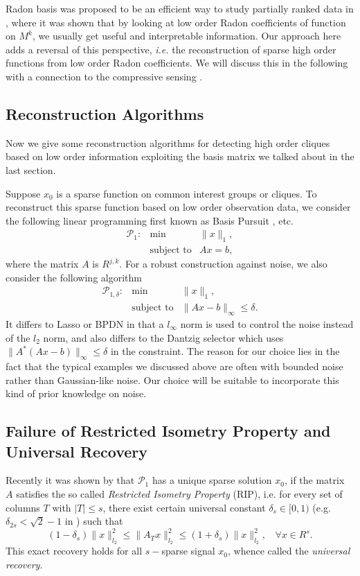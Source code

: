 \documentclass{article}
\begin{document}
Radon basis was proposed to be an efficient way to study partially ranked data in \cite{Persi88}, where 
it was shown that by looking at low order Radon coefficients of function on $M^k$, we usually get useful and interpretable 
information. Our approach here adds a reversal of this perspective, {\it i.e.} the reconstruction of sparse high order functions from low order Radon coefficients. We will discuss this in the following with a connection to the compressive sensing \cite{CheDonSau99, CanTao05}. 

\subsection{Reconstruction Algorithms}

Now we give some reconstruction algorithms for detecting high order cliques based on low order information exploiting the basis matrix we talked about in the last section. 

Suppose $x_0$ is a sparse function on common interest groups or cliques. To reconstruct this sparse function based on low order observation data, we consider the following linear programming first known as Basis Pursuit \cite{CheDonSau99}, etc. 
\begin{eqnarray*}
\mathcal{P}_1 :&\min& \|x\|_{1},\\
&\mbox{subject to}& Ax=b,
\end{eqnarray*}
where the matrix $A$ is $R^{j,k}$. For a robust construction against noise, we also consider the following algorithm
\begin{eqnarray*}
\mathcal{P}_{1,\delta} :  & \min & \|x \|_{1}, \\
& \mbox{subject to} & \| A x - b \|_\infty \leq \delta.
\end{eqnarray*}
It differs to Lasso \cite{Tib96-Lasso} or BPDN \cite{CheDonSau99} in that a $l_\infty$ norm is used to control the noise instead of the $l_2$ norm, and also differs to the Dantzig selector \cite{CanTao07-Dantzig} which uses $\|A^\ast (Ax - b )\|_\infty \leq \delta$ in the constraint. The reason for our choice lies in the fact that the typical examples we discussed above are often with bounded noise rather than Gaussian-like noise. Our choice will be suitable to incorporate this kind of prior knowledge on noise. 

\subsection{Failure of Restricted Isometry Property and Universal Recovery}
Recently it was shown by \cite{CanTao05,Candes08} that $\mathcal{P}_1$ has a unique sparse solution $x_0$, if the matrix $A$ satisfies the so called \emph{Restricted Isometry Property} (RIP), i.e.
for every set of columns $T$ with $|T|\leq s$, there exist certain universal constant $\delta_s\in [0,1)$ (e.g. $\delta_{2s} < \sqrt{2} -1$ in \cite{Candes08}) such that
\[ (1-\delta_s)\|x\|_{l_2}^2 \le \|A_Tx\|_{l_2}^2 \le (1+\delta_s)\|x\|_{l_2}^2, \ \ \ \  \forall x\in R^s. \]
This exact recovery holds for all $s-$sparse signal $x_0$,  whence called the \emph{universal recovery}.
\end{document}

